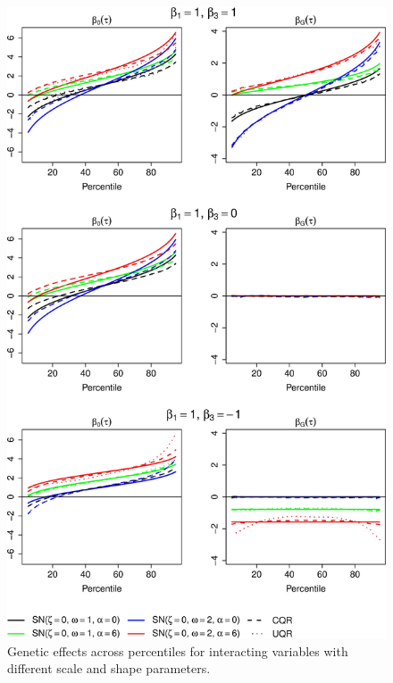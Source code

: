 \documentclass[12pt]{article}
\begin{document}
\begin{appendices}
\begin{figure}[h!]
	\centering
	\includegraphics[width=0.75 \textwidth, height=1.25\textwidth]{figures/QR_EXAMPLE_July148.jpg}
	\caption{Genetic effects across percentiles for interacting variables with different scale and shape parameters.}
	\label{fig:MotExample}
\end{figure}


\end{appendices}
\end{document}
